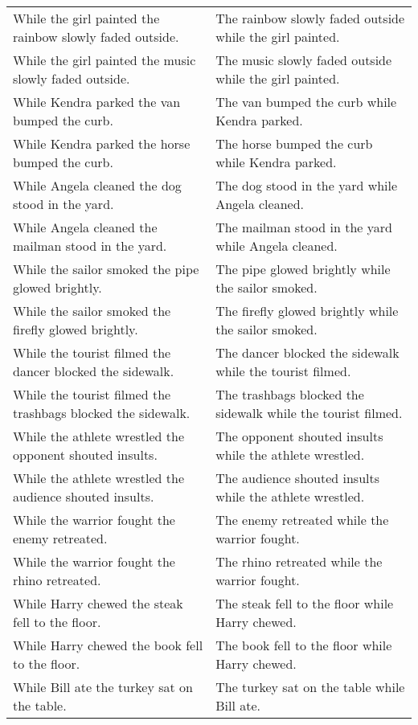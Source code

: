 \begin{center}
\begin{xtabular*}{\textwidth}{p{0.45\textwidth}|p{0.45\textwidth}}
        While the girl painted the rainbow slowly faded outside. & The rainbow slowly faded outside while the girl painted. \\
        While the girl painted the music slowly faded outside. & The music slowly faded outside while the girl painted. \\
        While Kendra parked the van bumped the curb. & The van bumped the curb while Kendra parked. \\
        While Kendra parked the horse bumped the curb. & The horse bumped the curb while Kendra parked. \\
        While Angela cleaned the dog stood in the yard. & The dog stood in the yard while Angela cleaned. \\
        While Angela cleaned the mailman stood in the yard. & The mailman stood in the yard while Angela cleaned. \\
        While the sailor smoked the pipe glowed brightly. & The pipe glowed brightly while the sailor smoked. \\
        While the sailor smoked the firefly glowed brightly. & The firefly glowed brightly while the sailor smoked. \\
        While the tourist filmed the dancer blocked the sidewalk. & The dancer blocked the sidewalk while the tourist filmed. \\
        While the tourist filmed the trashbags blocked the sidewalk. & The trashbags blocked the sidewalk while the tourist filmed. \\
        While the athlete wrestled the opponent shouted insults. & The opponent shouted insults while the athlete wrestled. \\
        While the athlete wrestled the audience shouted insults. & The audience shouted insults while the athlete wrestled. \\
        While the warrior fought the enemy retreated. & The enemy retreated while the warrior fought. \\
        While the warrior fought the rhino retreated. & The rhino retreated while the warrior fought. \\
        While Harry chewed the steak fell to the floor. & The steak fell to the floor while Harry chewed. \\
        While Harry chewed the book fell to the floor. & The book fell to the floor while Harry chewed. \\
        While Bill ate the turkey sat on the table. & The turkey sat on the table while Bill ate. \\

\end{xtabular*}
\end{center}
